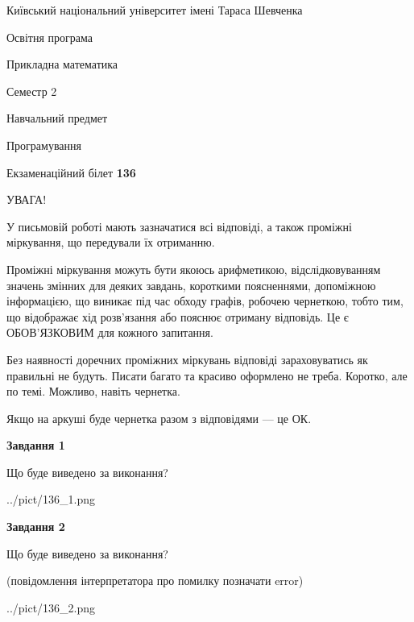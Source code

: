 \documentclass[12pt, ukrainian]{article}
\begin{document}
{{\begin {small}\par
{ \center  Київський національний університет імені Тараса Шевченка \par}
{\parbox {5 cm}{Освітня програма \hfill}{\parbox {7 cm}{Прикладна математика\hfill}}\parbox {6 cm}{\hfill Семестр 2}}\par
{\parbox {5 cm} {Навчальний предмет \hfill}\parbox {7 cm}{Програмування \hfill}\parbox {6cm}{\hfill}\par}\vspace{-7pt} \end{small}}{\center Екзаменаційний білет \No \textbf
{ 136 }\par}}
{
\begin {large}
УВАГА!

У письмовій роботі мають зазначатися всі відповіді, а також проміжні міркування, що передували їх отриманню.

Проміжні міркування можуть бути якоюсь арифметикою, відслідковуванням зна\-чень змінних для деяких завдань,
короткими поясненнями, допоміжною інформацією, що виникає під час обходу графів, робочею чернеткою,
тобто тим, що відображає хід розв’язання або пояснює отриману відповідь.
Це є ОБОВ’ЯЗКОВИМ для кожного запитання.

Без наявності доречних проміжних міркувань відповіді зараховуватись як правиль\-ні не будуть.
Писати багато та красиво оформлено не треба. Коротко, але по темі. Можли\-во, навіть чернетка.

Якщо на аркуші буде чернетка разом з відповідями --- це ОК.

\newpage

{\begin {center}\textbf{Завдання 1}\end {center}}\par
Що буде виведено за виконання?\par
\begin{center}
	{../pict/136_1.png}
\end{center}
\newpage

{\begin {center}\textbf{Завдання 2}\end {center}}\par
Що буде виведено за виконання?\par
 (повідомлення інтерпретатора про помилку позначати error)\par
\begin{center}
	{../pict/136_2.png}
\end{center}
\newpage


\end{large}}
\end{document}
